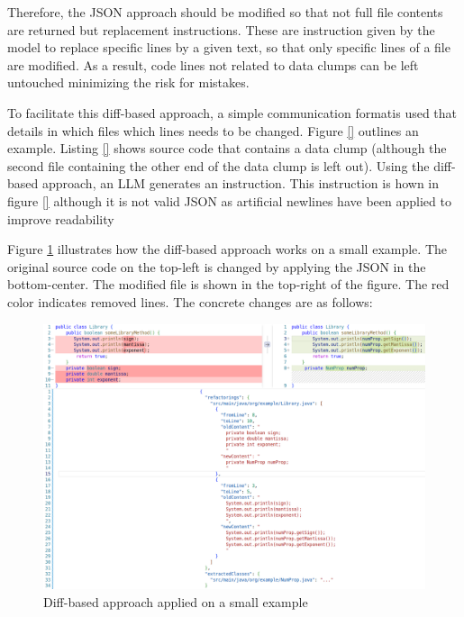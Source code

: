 Therefore, the \ac{JSON} approach should be modified so that not full file contents are returned but replacement instructions. These are instruction given by the model to replace specific lines by a given text, so that only specific lines of a file are modified.  As a result, code lines not related to data clumps can be left untouched minimizing the risk for mistakes. 


 
To facilitate this diff-based approach, a simple communication formatis used that details in which files which lines needs to be changed. Figure \ref{} outlines an example. Listing \ref{} shows source code that contains a data clump (although the second file containing the other end of the data clump is left out). Using the diff-based approach, an \ac{LLM} generates an instruction. This instruction is hown in figure \ref{} although it is not valid \ac{JSON} as artificial newlines have been applied to improve readability



Figure \ref{fig:json_based_changes} illustrates how the diff-based approach works on a small example. The original source code on the top-left is changed by applying the JSON in the bottom-center. The modified file is shown in the top-right of the figure. The red color indicates removed lines. The concrete changes are as follows:
\begin{figure}
    \centering
    \includegraphics[width=\columnwidth]{figures/chapter4/diff_original_changed_vscode_cmp.png}
    \caption{Diff-based approach applied on a small example}
    \label{fig:json_based_changes}
\end{figure}


